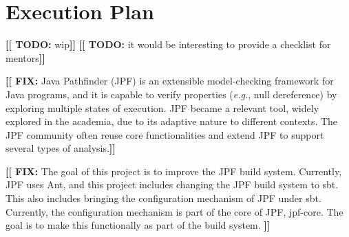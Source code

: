\documentclass[a4paper]{article}
\newcommand{\todo}[1]{\textbf{[[ TODO: }{\color{blue} #1}\textbf{]]}}
\newcommand{\fix}[1]{\textbf{[[ FIX: }{\color{red} #1}\textbf{]]}}
\newcommand{\eg}{\emph{e.g.}}
\begin{document}
\section{Execution Plan}
\label{sec:plan}

\todo{wip}
\todo{it would be interesting to provide a checklist for mentors}

\fix{Java Pathfinder (JPF) is an extensible model-checking framework for Java
programs, and it is capable to verify properties (\eg{}, null dereference) by
exploring multiple states of execution.
JPF became a relevant tool, widely explored in the academia, due to its adaptive
nature to different contexts.
The JPF community often reuse core functionalities and extend JPF to support
several types of analysis.}


\fix{
The goal of this project is to improve the JPF build system. Currently, JPF
uses Ant, and this project includes changing the JPF build system to sbt. This
also includes bringing the configuration mechanism of JPF under sbt. Currently,
the configuration mechanism is part of the core of JPF, jpf-core. The goal is
to make this functionally as part of the build system.
}
\end{document}
